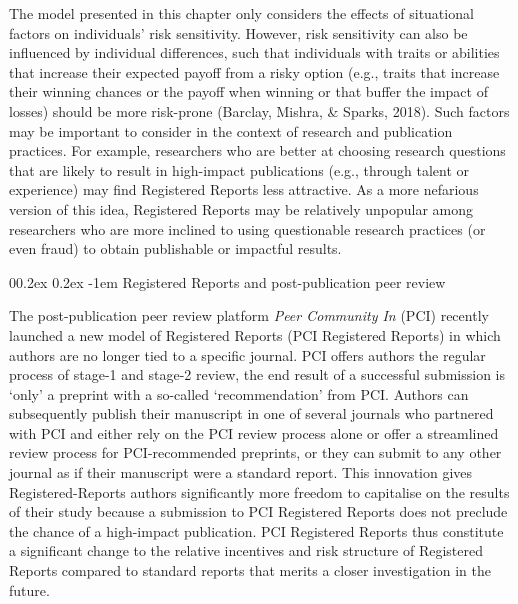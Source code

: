 \documentclass[
  ,man,mask,floatsintext]{apa6}
\makeatletter
\let\oldparagraph\paragraph
\renewcommand{\paragraph}[1]{\oldparagraph{#1}\mbox{}}
\renewcommand{\paragraph}{\@startsection{paragraph}{4}{\parindent}%
  {0\baselineskip \@plus 0.2ex \@minus 0.2ex}%
  {-1em}%
  {\normalfont\normalsize\bfseries\itshape\typesectitle}}
\makeatother
\begin{document}
The model presented in this chapter only considers the effects of situational factors on individuals' risk sensitivity.
However, risk sensitivity can also be influenced by individual differences, such that individuals with traits or abilities that increase their expected payoff from a risky option (e.g., traits that increase their winning chances or the payoff when winning or that buffer the impact of losses) should be more risk-prone (Barclay, Mishra, \& Sparks, 2018).
Such factors may be important to consider in the context of research and publication practices.
For example, researchers who are better at choosing research questions that are likely to result in high-impact publications (e.g., through talent or experience) may find Registered Reports less attractive.
As a more nefarious version of this idea, Registered Reports may be relatively unpopular among researchers who are more inclined to using questionable research practices (or even fraud) to obtain publishable or impactful results.

\hypertarget{registered-reports-and-post-publication-peer-review}{%
\paragraph{Registered Reports and post-publication peer review}\label{registered-reports-and-post-publication-peer-review}}

The post-publication peer review platform \emph{Peer Community In} (PCI) recently launched a new model of Registered Reports (PCI Registered Reports) in which authors are no longer tied to a specific journal.
PCI offers authors the regular process of stage-1 and stage-2 review, the end result of a successful submission is `only' a preprint with a so-called `recommendation' from PCI.
Authors can subsequently publish their manuscript in one of several journals who partnered with PCI and either rely on the PCI review process alone or offer a streamlined review process for PCI-recommended preprints, or they can submit to any other journal as if their manuscript were a standard report.
This innovation gives Registered-Reports authors significantly more freedom to capitalise on the results of their study because a submission to PCI Registered Reports does not preclude the chance of a high-impact publication.
PCI Registered Reports thus constitute a significant change to the relative incentives and risk structure of Registered Reports compared to standard reports that merits a closer investigation in the future.
\end{document}

